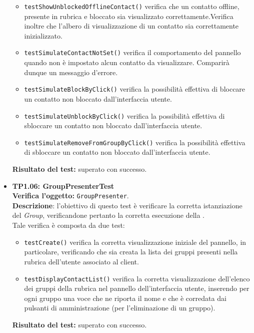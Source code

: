 \begin{itemize}
\begin{itemize}
\item \texttt{testShowUnblockedOfflineContact()} verifica che un contatto offline, presente in rubrica e bloccato sia visualizzato correttamente.Verifica inoltre che l'albero di visualizzazione di un contatto sia correttamente inizializzato.

\item \texttt{testSimulateContactNotSet()} verifica il comportamento del pannello quando non è impostato alcun contatto da visualizzare. Comparirà dunque un messaggio d'errore.

\item \texttt{testSimulateBlockByClick()} verifica la possibilità effettiva di bloccare un contatto non bloccato dall'interfaccia utente.

\item \texttt{testSimulateUnblockByClick()} verifica la possibilità effettiva di sbloccare un contatto non bloccato dall'interfaccia utente.

\item \texttt{testSimulateRemoveFromGroupByClick()} verifica la possibilità effettiva di sbloccare un contatto non bloccato dall'interfaccia utente.

\end{itemize}
\textbf{Risultato del test:} superato con successo.

\item \textbf{TP1.06: GroupPresenterTest}\\   %
\textbf{Verifica l'oggetto:} \texttt{GroupPresenter}.\\
\textbf{Descrizione}: l'obiettivo di questo test è verificare la corretta istanziazione del \textit{Group}, verificandone pertanto la corretta esecuzione della .\\
Tale verifica è composta da due test:
\begin{itemize}
\item \texttt{testCreate()} verifica la corretta visualizzazione iniziale del pannello, in particolare, verificando che sia creata la lista dei gruppi presenti nella rubrica dell'utente associato al client.
\item \texttt{testDisplayContactList()} verifica la corretta visualizzazione dell'elenco dei gruppi della rubrica nel pannello dell'interfaccia utente, inserendo per ogni gruppo una voce che ne riporta il nome e che è corredata dai pulsanti di amministrazione (per l'eliminazione di un gruppo).
\end{itemize}
\textbf{Risultato del test:} superato con successo.


\end{itemize}
